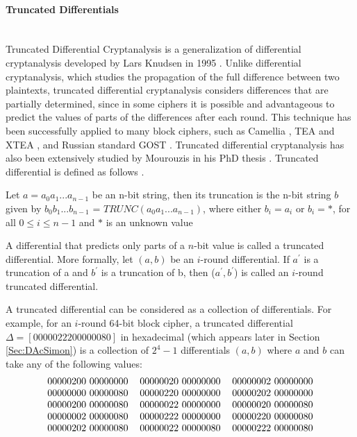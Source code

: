 \paragraph{Truncated Differentials} \mbox{ } \\
Truncated Differential Cryptanalysis is a generalization of differential cryptanalysis developed by Lars Knudsen in 1995 \cite{Knudsen95}. Unlike differential cryptanalysis, which studies the propagation of the full difference between two plaintexts, truncated differential cryptanalysis considers differences that are partially determined, since in some ciphers it is possible and advantageous to predict the values of parts of the differences after each round. This technique has been successfully applied to many block ciphers, such as Camellia \cite{sugita2001security}, TEA and XTEA \cite{hong2003differential}, and Russian standard GOST \cite{gostdc2,TheoPhD,courtois2015can}. Truncated differential cryptanalysis has also been extensively studied by Mourouzis in his PhD thesis \cite{TheoPhD}. Truncated differential is defined as follows \cite{Knudsen95}.
\begin{mydef}
	Let $a = a_{0}a_{1}...a_{n-1}$ be an n-bit string, then its truncation is the n-bit string $b$ given by $b_{0}b_{1}...b_{n-1}$ = $TRUNC(a_{0}a_{1}...a_{n-1})$, where either $b_{i} = a_{i}$ or $b_{i} = *$, for all $0 \leq i \leq n-1 $ and $*$ is an unknown value
\end{mydef}

\begin{mydef}
	A differential that predicts only parts of a $n$-bit value is called a truncated differential. More formally, let $(a,b)$ be an $i$-round differential. If $a^{'}$ is a truncation of a and $b^{'}$ is a truncation of b, then ($a^{'},b^{'}$) is called an $i$-round truncated differential.
\end{mydef}

A truncated differential can be considered as a collection of differentials. For example, for an $i$-round 64-bit block cipher, a truncated differential $\Delta=[00000222 00000080]$ in hexadecimal (which appears later in Section \ref{Sec:DAcSimon})  is a collection of $2^{4}-1$ differentials $(a,b)$ where $a$ and $b$ can take any of the following values:
\[
\begin{tabular}{ccc}
00000200 00000000 &  00000020 00000000 & 00000002 00000000 \\ 
00000000 00000080 &  00000220 00000000 & 00000202 00000000 \\
00000200 00000080 &  00000022 00000000 & 00000020 00000080 \\ 
00000002 00000080 &  00000222 00000000 & 00000220 00000080 \\ 
00000202 00000080 &  00000022 00000080 & 00000222 00000080 
\end{tabular}
\]

